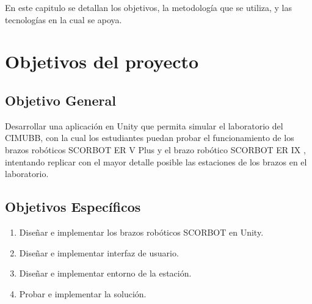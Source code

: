 En este capitulo se detallan los objetivos, la metodología que se utiliza, y las tecnologías en la cual se apoya.

\section{Objetivos del proyecto}

\subsection{Objetivo General}
Desarrollar una aplicación en Unity que permita simular el laboratorio
del CIMUBB, con la cual los estudiantes puedan probar el funcionamiento de los
brazos robóticos SCORBOT ER V Plus y el brazo robótico SCORBOT ER IX , intentando replicar con el mayor detalle posible
las estaciones de los brazos en el laboratorio.

\subsection{Objetivos Específicos}
\begin{enumerate}
\item Diseñar e implementar los brazos robóticos SCORBOT en Unity.
\item Diseñar e implementar interfaz de usuario.
\item Diseñar e implementar entorno de la estación.
\item Probar e implementar la solución.
\end{enumerate}

